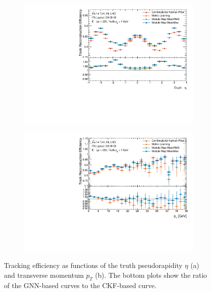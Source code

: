 \begin{figure}
\centering
\begin{subfigure}{0.65\textwidth}
    \centering
    \includegraphics[width=\textwidth]{figures/ckf-gnn/Efficiency/efficiency_vs_eta.pdf}
    \caption{}
    \label{subfig:tracking-eff-eta}
\end{subfigure} 
\begin{subfigure}{0.65\textwidth}
    \centering
    \includegraphics[width=\textwidth]{figures/ckf-gnn/Efficiency/efficiency_vs_pt.pdf}
    \caption{}
    \label{subfig:tracking-eff-pt}
\end{subfigure}
\caption{Tracking efficiency as functions of the truth pseudorapidity $\eta$ (a) and transverse momentum $p_T$ (b). The bottom plots show the ratio of the GNN-based curves to the CKF-based curve.}
\label{fig:tracking-eff}
\end{figure}

